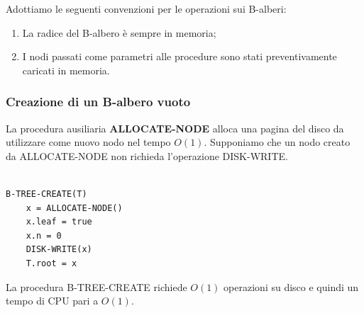 Adottiamo le seguenti convenzioni per le operazioni sui B-alberi:

\begin{enumerate}

\item La radice del B-albero è sempre in memoria;
\item I nodi passati come parametri alle procedure sono stati preventivamente caricati in memoria.

\end{enumerate}

\subsubsection{Creazione di un B-albero vuoto}

La procedura ausiliaria \textbf{ALLOCATE-NODE} alloca una pagina del disco da utilizzare come nuovo nodo nel tempo $O(1)$. Supponiamo che un nodo creato da ALLOCATE-NODE non richieda l'operazione DISK-WRITE.

\begin{lstlisting}[caption=Creazione di un B-albero]

B-TREE-CREATE(T)
	x = ALLOCATE-NODE()
	x.leaf = true
	x.n = 0
	DISK-WRITE(x)
	T.root = x

\end{lstlisting}

La procedura B-TREE-CREATE richiede $O(1)$ operazioni su disco e quindi un tempo di CPU pari a $O(1)$.